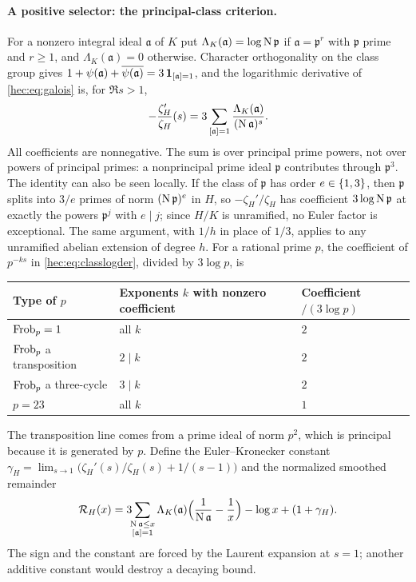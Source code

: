 \paragraph{A positive selector: the principal-class criterion.}
For a nonzero integral ideal $\mathfrak a$ of $K$ put $\Lambda_K(\mathfrak a)=\log\operatorname{N}\mathfrak p$ if
$\mathfrak a=\mathfrak p^r$ with $\mathfrak p$ prime and $r\ge1$, and $\Lambda_K(\mathfrak a)=0$ otherwise.
Character orthogonality on the class group gives
$1+\psi(\mathfrak a)+\overline{\psi(\mathfrak a)}=3\,\mathbf{1}_{[\mathfrak a]=1}$, and the logarithmic
derivative of \eqref{hec:eq:galois} is, for $\Re s>1$,
\begin{equation}\label{hec:eq:classlogder}
-\frac{\zeta_H'}{\zeta_H}(s)
=3\sum_{[\mathfrak a]=1}\frac{\Lambda_K(\mathfrak a)}{(\operatorname{N}\mathfrak a)^s}.
\end{equation}
All coefficients are nonnegative. The sum is over principal prime powers, not over powers of principal
primes: a nonprincipal prime ideal $\mathfrak p$ contributes through $\mathfrak p^3$. The identity can also
be seen locally. If the class of $\mathfrak p$ has order $e\in\{1,3\}$, then $\mathfrak p$ splits into
$3/e$ primes of norm $(\operatorname{N}\mathfrak p)^e$ in $H$, so $-\zeta_H'/\zeta_H$ has coefficient
$3\log\operatorname{N}\mathfrak p$ at exactly the powers $\mathfrak p^j$ with $e\mid j$; since $H/K$ is unramified, no
Euler factor is exceptional. The same argument, with $1/h$ in place of $1/3$, applies to any unramified
abelian extension of degree $h$. For a rational prime $p$, the coefficient of $p^{-ks}$ in
\eqref{hec:eq:classlogder}, divided by $3\log p$, is
\begin{center}
\begin{tabular}{lll}
\toprule
Type of $p$ & Exponents $k$ with nonzero coefficient & Coefficient$/(3\log p)$\\
\midrule
$\operatorname{Frob}_p=1$ & all $k$ & $2$\\
$\operatorname{Frob}_p$ a transposition & $2\mid k$ & $2$\\
$\operatorname{Frob}_p$ a three-cycle & $3\mid k$ & $2$\\
$p=23$ & all $k$ & $1$\\
\bottomrule
\end{tabular}
\end{center}
The transposition line comes from a prime ideal of norm $p^2$, which is principal because it is generated
by $p$. Define the Euler--Kronecker constant
$\gamma_H=\lim_{s\to1}\bigl(\zeta_H'(s)/\zeta_H(s)+1/(s-1)\bigr)$ and the normalized smoothed remainder
\begin{equation}\label{hec:eq:RH}
\mathcal R_H(x)=
3\!\!\sum_{\substack{\operatorname{N}\mathfrak a\le x\\{}[\mathfrak a]=1}}
\Lambda_K(\mathfrak a)
\Bigl(\frac1{\operatorname{N}\mathfrak a}-\frac1x\Bigr)
-\log x+(1+\gamma_H).
\end{equation}
The sign and the constant are forced by the Laurent expansion at $s=1$; another additive constant would
destroy a decaying bound.

